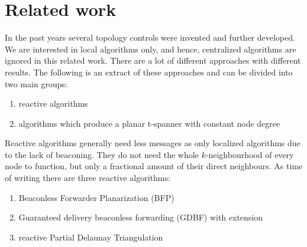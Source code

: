 

%



\section{Related work}

In the past years several topology controls were invented and further developed.
We are interested in local algorithms only, and hence, centralized algorithms are ignored in this related work.
There are a lot of different approaches with different results.
The following is an extract of these approaches and can be divided into two main groups:
\begin{enumerate}
\item reactive algorithms
\item algorithms which produce a planar t-spanner with constant node degree
\end{enumerate}

Reactive algorithms generally need less messages as only localized algorithms due to the lack of beaconing.
They do not need the whole $k $-neighbourhood of every node to function, but only a fractional amount of their direct neighbours.
As time of writing there are three reactive algorithms:
\begin{enumerate}
\item Beaconless Forwarder Planarization (BFP)
\item Guaranteed delivery beaconless forwarding (GDBF) with extension
\item reactive Partial Delaunay Triangulation
\end{enumerate}

